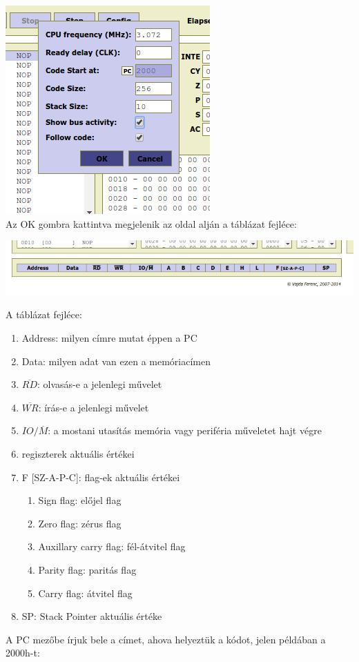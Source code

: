 \documentclass{article}
\begin{document}
\includegraphics[scale=0.5]{sim_lepes3.png} \\
Az OK gombra kattintva megjelenik az oldal alján a táblázat fejléce:

\includegraphics[scale=0.5]{sim_lepes4.png}

A táblázat fejléce:
\begin{enumerate}
	\item Address: milyen címre mutat éppen a PC
	\item Data: milyen adat van ezen a memóriacímen
	\item $\overline{RD}$: olvasás-e a jelenlegi művelet
	\item $\overline{WR}$: írás-e a jelenlegi művelet
	\item $IO/\overline{M}$: a mostani utasítás memória vagy periféria műveletet hajt végre
	\item regiszterek aktuális értékei
	\item F [SZ-A-P-C]: flag-ek aktuális értékei
	\begin{enumerate}
		\item Sign flag: előjel flag
		\item Zero flag: zérus flag
		\item Auxillary carry flag: fél-átvitel flag
		\item Parity flag: paritás flag
		\item Carry flag: átvitel flag
	\end{enumerate}
	\item SP: Stack Pointer aktuális értéke
\end{enumerate}
A PC mezőbe írjuk bele a címet, ahova helyeztük a kódot, jelen példában a 2000h-t:
\end{document}
